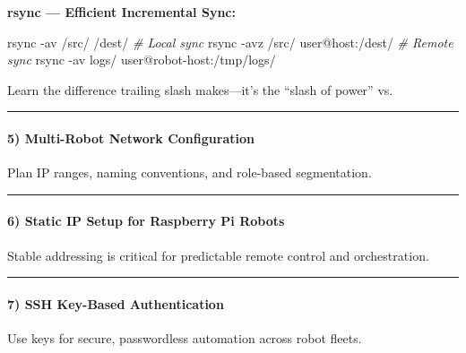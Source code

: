 \documentclass[
  english,
  paper=a4,
  oneside  ,captions=tableheading
]{scrartcl}
\newenvironment{Shaded}{}{}
\newcommand{\AttributeTok}[1]{\textcolor[rgb]{0.49,0.56,0.16}{#1}}
\newcommand{\CommentTok}[1]{\textcolor[rgb]{0.38,0.63,0.69}{\textit{#1}}}
\newcommand{\FunctionTok}[1]{\textcolor[rgb]{0.02,0.16,0.49}{#1}}
\newcommand{\NormalTok}[1]{#1}
\renewenvironment{quote}{\begin{customblockquote}\list{}{\rightmargin=0em\leftmargin=0em}%
\item\relax\color{blockquote-text}\ignorespaces}{\unskip\unskip\endlist\end{customblockquote}}
\begin{document}
\textbf{rsync --- Efficient Incremental Sync:}

\begin{Shaded}
\begin{Highlighting}[]
\FunctionTok{rsync} \AttributeTok{{-}av}\NormalTok{ /src/ /dest/                           }\CommentTok{\# Local sync}
\FunctionTok{rsync} \AttributeTok{{-}avz}\NormalTok{ /src/ user@host:/dest/                }\CommentTok{\# Remote sync}
\FunctionTok{rsync} \AttributeTok{{-}av}\NormalTok{ logs/ user@robot{-}host:/tmp/logs/}
\end{Highlighting}
\end{Shaded}

\begin{quote}
Learn the difference trailing slash makes---it's the ``slash of power''
vs.
\end{quote}

\begin{center}\rule{0.5\linewidth}{0.5pt}\end{center}

\paragraph{5) Multi-Robot Network
Configuration}\label{multi-robot-network-configuration}

Plan IP ranges, naming conventions, and role-based segmentation.

\begin{center}\rule{0.5\linewidth}{0.5pt}\end{center}

\paragraph{6) Static IP Setup for Raspberry Pi
Robots}\label{static-ip-setup-for-raspberry-pi-robots}

Stable addressing is critical for predictable remote control and
orchestration.

\begin{center}\rule{0.5\linewidth}{0.5pt}\end{center}

\paragraph{7) SSH Key-Based
Authentication}\label{ssh-key-based-authentication}

Use keys for secure, passwordless automation across robot fleets.
\end{document}
